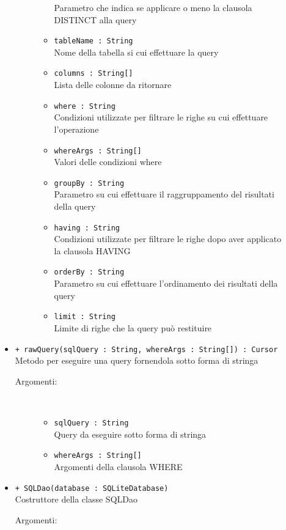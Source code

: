 \documentclass[../DefinizioneDiProdotto.tex]{subfiles}
\begin{document}
\begin{description}
\begin{itemize}
\begin{description}
\begin{itemize}
Parametro che indica se applicare o meno la clausola DISTINCT alla query\item \texttt{tableName : String}\\
Nome della tabella si cui effettuare la query\item \texttt{columns : String[]}\\
Lista delle colonne da ritornare\item \texttt{where : String}\\
Condizioni utilizzate per filtrare le righe su cui effettuare l'operazione\item \texttt{whereArgs : String[]}\\
Valori delle condizioni where\item \texttt{groupBy : String}\\
Parametro su cui effettuare il raggruppamento del risultati della query\item \texttt{having : String}\\
Condizioni utilizzate per filtrare le righe dopo aver applicato la clausola HAVING\item \texttt{orderBy : String}\\
Parametro su cui effettuare l'ordinamento dei risultati della query\item \texttt{limit : String}\\
Limite di righe che la query può restituire\end{itemize}
\end{description}
\item \texttt{+ rawQuery(sqlQuery : String, whereArgs : String[]) : Cursor}\\
Metodo per eseguire una query fornendola sotto forma di stringa
 \begin{description}
\item[Argomenti:] \
\begin{itemize}
\item \texttt{sqlQuery : String}\\
Query da eseguire sotto forma di stringa\item \texttt{whereArgs : String[]}\\
Argomenti della clausola WHERE\end{itemize}
\end{description}
\item \texttt{+ SQLDao(database : SQLiteDatabase)}\\
Costruttore della classe SQLDao
 \begin{description}
\item[Argomenti:] \

\end{description}
\end{itemize}
\end{description}
\end{document}
